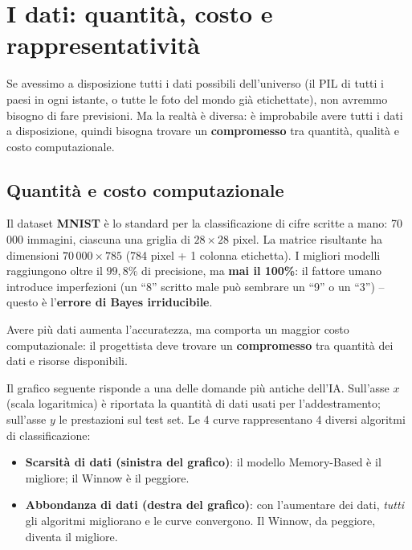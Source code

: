 \section{I dati: quantità, costo e rappresentatività}
Se avessimo a disposizione tutti i dati possibili dell'universo (il PIL di tutti i paesi in ogni istante, o tutte le foto del mondo già etichettate), non avremmo bisogno di fare previsioni. Ma la realtà è diversa: è improbabile avere tutti i dati a disposizione, quindi bisogna trovare un \textbf{compromesso} tra quantità, qualità e costo computazionale.

\subsection{Quantità e costo computazionale}
Il dataset \textbf{MNIST} è lo standard per la classificazione di cifre scritte a mano: 70\,000 immagini, ciascuna una griglia di $28 \times 28$ pixel. La matrice risultante ha dimensioni $70\,000 \times 785$ (784 pixel + 1 colonna etichetta). I migliori modelli raggiungono oltre il $99{,}8\%$ di precisione, ma \textbf{mai il 100\%}: il fattore umano introduce imperfezioni (un ``8'' scritto male può sembrare un ``9'' o un ``3'') -- questo è l'\textbf{errore di Bayes irriducibile}.

Avere più dati aumenta l'accuratezza, ma comporta un maggior costo computazionale: il progettista deve trovare un \textbf{compromesso} tra quantità dei dati e risorse disponibili.

\begin{notebox}
Il grafico seguente risponde a una delle domande più antiche dell'IA. Sull'asse $x$ (scala logaritmica) è riportata la quantità di dati usati per l'addestramento; sull'asse $y$ le prestazioni sul test set. Le 4 curve rappresentano 4 diversi algoritmi di classificazione:
\begin{itemize}
    \item \textbf{Scarsità di dati (sinistra del grafico)}: il modello Memory-Based è il migliore; il Winnow è il peggiore.
    \item \textbf{Abbondanza di dati (destra del grafico)}: con l'aumentare dei dati, \emph{tutti} gli algoritmi migliorano e le curve convergono. Il Winnow, da peggiore, diventa il migliore.
\end{itemize}
\end{notebox}

